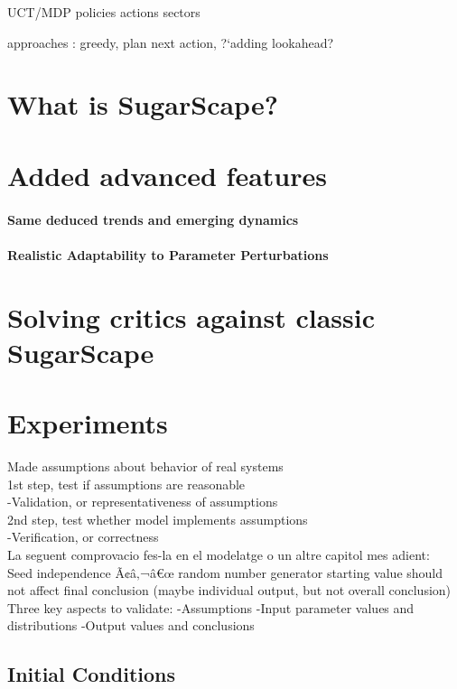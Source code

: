 \documentclass[11pt,oneside,a4paper,openright]{report}
\begin{document}
	    UCT/MDP
	    policies
	    actions
	    sectors

	    approaches : greedy, plan next action, ?`adding lookahead?




	\section{What is SugarScape?}
	\section{Added advanced features}
		\paragraph{Same deduced trends and emerging dynamics}
		\paragraph{Realistic Adaptability to Parameter Perturbations}
	\section{Solving critics against classic SugarScape}
	\section{Experiments}

Made assumptions about behavior of real systems\\
  1st step, test if assumptions are reasonable\\
    -Validation, or representativeness of assumptions\\
  2nd step, test whether model implements assumptions\\
    -Verification, or correctness\\

La seguent comprovacio fes-la en el modelatge o un altre capitol mes adient:\\
Seed independence Ã¢â‚¬â€œ random number generator starting value should not affect final conclusion (maybe individual output, but not overall conclusion)
Three key aspects to validate:
  -Assumptions
  -Input parameter values and distributions
  -Output values and conclusions





		\subsection{Initial Conditions}
\end{document}
